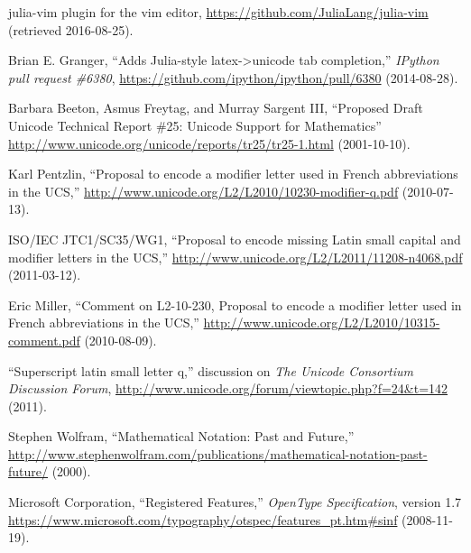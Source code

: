 \documentclass[10pt,english]{article}
\begin{document}
\begin{thebibliography}{10}
julia-vim plugin for the vim editor, \url{https://github.com/JuliaLang/julia-vim}
(retrieved 2016-08-25).

Brian E. Granger, ``Adds Julia-style
latex->unicode tab completion,'' \emph{IPython pull
request \#6380}, \url{https://github.com/ipython/ipython/pull/6380}
(2014-08-28).

Barbara Beeton, Asmus Freytag, and Murray Sargent
III, ``Proposed Draft Unicode Technical Report \#25:
Unicode Support for Mathematics'' \url{http://www.unicode.org/unicode/reports/tr25/tr25-1.html} (2001-10-10).

Karl Pentzlin, ``Proposal to encode
a modifier letter used in French abbreviations in the UCS,''
\url{http://www.unicode.org/L2/L2010/10230-modifier-q.pdf}
(2010-07-13). 

ISO/IEC JTC1/SC35/WG1, ``Proposal
to encode missing Latin small capital and modifier letters in the
UCS,'' \url{http://www.unicode.org/L2/L2011/11208-n4068.pdf}
(2011-03-12).

Eric Miller, ``Comment on L2-10-230,
Proposal to encode a modifier letter used in French abbreviations
in the UCS,'' \url{http://www.unicode.org/L2/L2010/10315-comment.pdf}
(2010-08-09).

``Superscript latin small letter q,''
discussion on \emph{The Unicode Consortium Discussion Forum}, \url{http://www.unicode.org/forum/viewtopic.php?f=24&t=142}
(2011).

Stephen Wolfram, ``Mathematical
Notation: Past and Future,'' \url{http://www.stephenwolfram.com/publications/mathematical-notation-past-future/}
(2000).

Microsoft Corporation, ``Registered
Features,'' \emph{OpenType Specification}, version
1.7 \url{https://www.microsoft.com/typography/otspec/features_pt.htm\#sinf}
(2008-11-19). \end{thebibliography}
\end{document}

